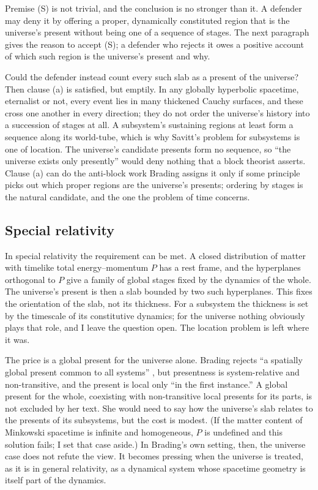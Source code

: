 \documentclass[11pt]{article}
\begin{document}
Premise (S) is not trivial, and the conclusion is no stronger than it. A
defender may deny it by offering a proper, dynamically constituted region that
is the universe's present without being one of a sequence of stages. The next
paragraph gives the reason to accept (S); a defender who rejects it owes a
positive account of which such region is the universe's present and why.

Could the defender instead count every such slab as a present of the
universe? Then clause (a) is satisfied, but emptily. In any globally
hyperbolic spacetime, eternalist or not, every event lies in many thickened
Cauchy surfaces, and these cross one another in every direction; they do not
order the universe's history into a succession of stages at all. A
subsystem's sustaining regions at least form a sequence along its world-tube,
which is why Savitt's problem for subsystems is one of location. The
universe's candidate presents form no sequence, so ``the universe exists only
presently'' would deny nothing that a block theorist asserts. Clause (a) can do
the anti-block work Brading assigns it only if some principle picks out which
proper regions are the universe's presents; ordering by stages is the natural
candidate, and the one the problem of time concerns.

\subsection{Special relativity}

In special relativity the requirement can be met. A closed distribution of
matter with timelike total energy--momentum $P$ has a rest frame, and the
hyperplanes orthogonal to $P$ give a family of global stages fixed by the
dynamics of the whole. The universe's present is then a slab bounded by two
such hyperplanes. This fixes the orientation of the slab, not its thickness. For a
subsystem the thickness is set by the timescale of its constitutive dynamics; for
the universe nothing obviously plays that role, and I leave the question open. The
location problem is left where it was.

The price is a global present for the universe alone. Brading rejects ``a
spatially global present common to all systems'' \citep[p.~17]{Brading2015},
but presentness is system-relative and non-transitive, and the present is local
only ``in the first instance.'' A global present for the whole, coexisting with
non-transitive local presents for its parts, is not excluded by her text. She
would need to say how the universe's slab relates to the presents of its
subsystems, but the cost is modest. (If the matter content of Minkowski
spacetime is infinite and homogeneous, $P$ is undefined and this solution
fails; I set that case aside.) In Brading's own setting, then, the universe case
does not refute the view. It becomes pressing when the universe is treated, as
it is in general relativity, as a dynamical system whose spacetime geometry is
itself part of the dynamics.
\end{document}
